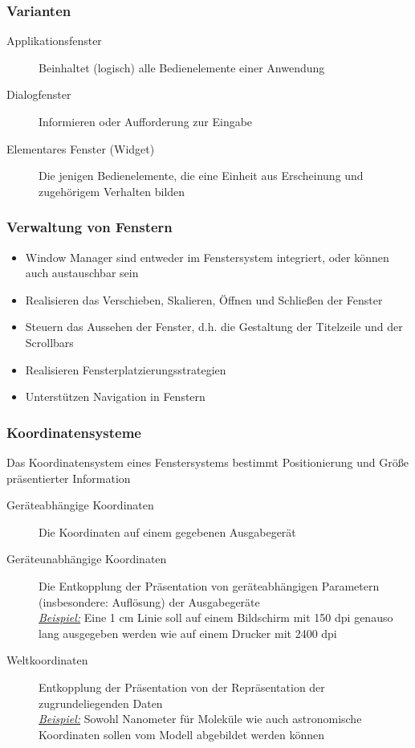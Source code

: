 \documentclass
[
	8pt,		%
	ngerman,	%
	a4paper,	%
	landscape,	%
	final		%
]{extarticle}
\newcommand{\example}{\textit{\underline{Beispiel:} }}
\begin{document}
\begin{multicols*}{4}
	\subsubsection{Varianten}
	\begin{description}
		\item[Applikationsfenster] Beinhaltet (logisch) alle Bedienelemente
		      einer Anwendung
		\item[Dialogfenster] Informieren oder Aufforderung zur Eingabe
		\item[Elementares Fenster (Widget)] Die jenigen Bedienelemente, die eine
		      Einheit aus Erscheinung und zugehörigem Verhalten bilden
	\end{description}
	\subsubsection{Verwaltung von Fenstern}
	\begin{itemize}
		\item Window Manager sind entweder im Fenstersystem integriert, oder
		      können auch austauschbar sein
		\item Realisieren das Verschieben, Skalieren, Öffnen und Schließen der
		      Fenster
		\item Steuern das Aussehen der Fenster, d.h. die Gestaltung der
		      Titelzeile und der Scrollbars
		\item Realisieren Fensterplatzierungsstrategien
		\item Unterstützen Navigation in Fenstern
	\end{itemize}
	\subsubsection{Koordinatensysteme}
	Das Koordinatensystem eines Fenstersystems bestimmt Positionierung und Größe
	präsentierter Information
	\begin{description}
		\item[Geräteabhängige Koordinaten] Die Koordinaten auf einem gegebenen
		      Ausgabegerät
		\item[Geräteunabhängige Koordinaten] Die Entkopplung der Präsentation
		      von geräteabhängigen Parametern (insbesondere: Auflösung) der
		      Ausgabegeräte \\
		      \example Eine 1 cm Linie soll auf einem Bildschirm mit 150 dpi
		      genauso lang ausgegeben werden wie auf einem Drucker mit 2400 dpi
		\item[Weltkoordinaten] Entkopplung der Präsentation von der
		      Repräsentation der zugrundeliegenden Daten \\
		      \example Sowohl Nanometer für Moleküle wie auch astronomische
		      Koordinaten sollen vom Modell abgebildet werden können
	\end{description}

\end{multicols*}
\end{document}
